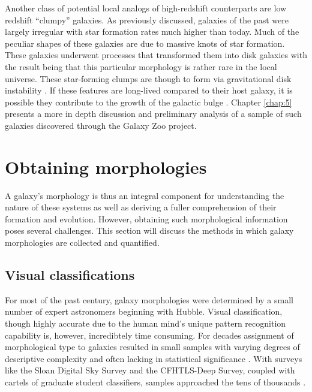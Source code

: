 Another class of potential local analogs of high-redshift counterparts are low redshift ``clumpy'' galaxies. As previously discussed, galaxies of the past were largely irregular with star formation rates much higher than today. Much of the peculiar shapes of these galaxies are due to massive knots of star formation. These galaxies underwent processes that transformed them into disk galaxies with the result being that this particular morphology is rather rare in the local universe. These star-forming clumps are though to form via gravitational disk instability \citep{Toomre1964}. If these features are long-lived compared to their host galaxy, it is possible they contribute to the growth of the galactic bulge \citep{Conselice2014}. Chapter \ref{chap:5} presents a more in depth discussion and preliminary analysis of a sample of such galaxies discovered through the Galaxy Zoo project.


\section{Obtaining morphologies}
A galaxy's morphology is thus an integral component for understanding the nature of these systems as well as deriving a fuller comprehension of their formation and evolution. However, obtaining such morphological information poses several challenges. This section will discuss the methods in which galaxy morphologies are collected and quantified. 

\subsection{Visual classifications}
For most of the past century, galaxy morphologies were determined by a small number of expert astronomers beginning with Hubble. Visual classification, though highly accurate due to the human mind's unique pattern recognition capability is, however, incredibtely time consuming. For decades assignment of morphological type to galaxies resulted in small samples with varying degrees of descriptive complexity and often lacking in statistical significance \citep{Hubble1936, Sandage1961, SandageTammann1981, deVaucouleurs1963, deVaucouleurs1991}. With surveys like the Sloan Digital Sky Survey \citep[SDSS,][]{Abazajian2003} and the CFHTLS-Deep Survey, coupled with cartels of graduate student classifiers, samples approached the tens of thousands \citep{Fukugita2007, Schawinski2007, NairAbraham2010}.

